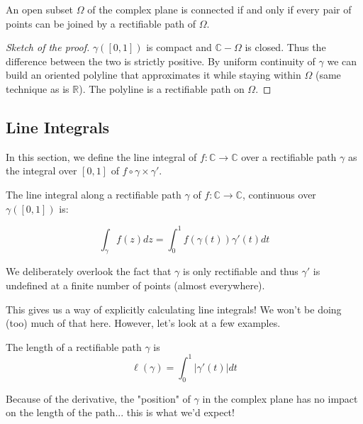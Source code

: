 \begin{thm*}
    An open subset $\Omega$ of the complex plane is connected if and only if every pair of points can be joined by a rectifiable path of $\Omega$.
\end{thm*}

\begin{proof}[Sketch of the proof]
    $\gamma([0,1])$ is compact and $\mathbb{C} - \Omega$ is closed. Thus the difference between the two is strictly positive. By uniform continuity of $\gamma$ we can build an oriented polyline that approximates it while staying within $\Omega$ (same technique as is $\mathbb{R}$). The polyline is a rectifiable path on $\Omega$.
\end{proof}

\subsection{Line Integrals}
In this section, we define the line integral of $f:\mathbb{C} \rightarrow \mathbb{C}$ over a rectifiable path $\gamma$ as the integral over $[0,1]$ of $f\circ\gamma \times \gamma'$.

\begin{defi}
    The line integral along a rectifiable path $\gamma$ of $f:\mathbb{C} \rightarrow \mathbb{C}$, continuous over $\gamma([0,1])$ is:

    $$ \int_\gamma f(z)dz = \int_0^1 f(\gamma(t))\gamma'(t)dt$$
\end{defi}

\begin{note}
    We deliberately overlook the fact that $\gamma$ is only rectifiable and thus $\gamma'$ is undefined at a finite number of points (almost everywhere). 
\end{note}

This gives us a way of explicitly calculating line integrals! We won't be doing (too) much of that here. However, let's look at a few examples.

\begin{defi}
    The length of a rectifiable path $\gamma$ is 
    $$ \ell(\gamma) = \int_0^1 |\gamma'(t)|dt$$
\end{defi}

\begin{note}
    Because of the derivative, the "position" of $\gamma$ in the complex plane has no impact on the length of the path... this is what we'd expect!
\end{note}

